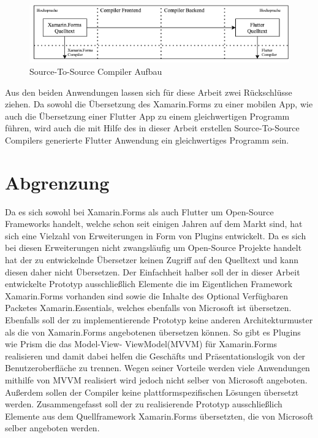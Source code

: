 \begin{figure}[!ht]
 \includegraphics[width=14.5cm]{Images/CompilerArchitecture/S2SArchitecture.png}
 \caption{Source-To-Source Compiler Aufbau}
 \label{fig:S2SCompilerAufbau}
\end{figure}

Aus den beiden Anwendungen lassen sich für diese Arbeit zwei Rückschlüsse ziehen.  Da sowohl die Übersetzung des Xamarin.Forms zu einer mobilen App, wie auch die Übersetzung einer Flutter App zu einem gleichwertigen Programm führen, wird auch die mit Hilfe des in dieser Arbeit erstellen Source-To-Source Compilers generierte Flutter Anwendung ein gleichwertiges Programm sein.


\section{Abgrenzung}
Da es sich sowohl bei Xamarin.Forms als auch Flutter um Open-Source Frameworks handelt, welche schon seit einigen Jahren auf dem Markt sind,  hat sich  eine Vielzahl von Erweiterungen in Form von Plugins entwickelt.  Da es sich bei diesen Erweiterungen nicht zwangsläufig um Open-Source Projekte handelt hat der zu entwickelnde Übersetzer keinen Zugriff auf den Quelltext und kann diesen daher nicht Übersetzen.  Der Einfachheit halber soll der in dieser Arbeit entwickelte Prototyp ausschließlich Elemente die im Eigentlichen Framework Xamarin.Forms vorhanden sind sowie die Inhalte des Optional Verfügbaren Packetes Xamarin.Essentials, welches ebenfalls von Microsoft ist übersetzen.  Ebenfalls soll der zu implementierende Prototyp keine anderen Architekturmuster als die von Xamarin.Forms angebotenen übersetzen können.  So gibt es Plugins wie Prism die das Model-View- ViewModel(MVVM) für Xamarin.Forms realisieren und damit dabei helfen die Geschäfts und Präsentationslogik von der Benutzeroberfläche zu trennen.  Wegen seiner Vorteile werden viele Anwendungen mithilfe von MVVM realisiert wird jedoch nicht selber von Microsoft angeboten.  Außerdem sollen der Compiler keine plattformspezifischen Lösungen übersetzt werden.
Zusammengefasst soll der zu realisierende Prototyp ausschließlich Elemente aus dem Quellframework Xamarin.Forms übersetzten, die von Microsoft selber angeboten werden. 

